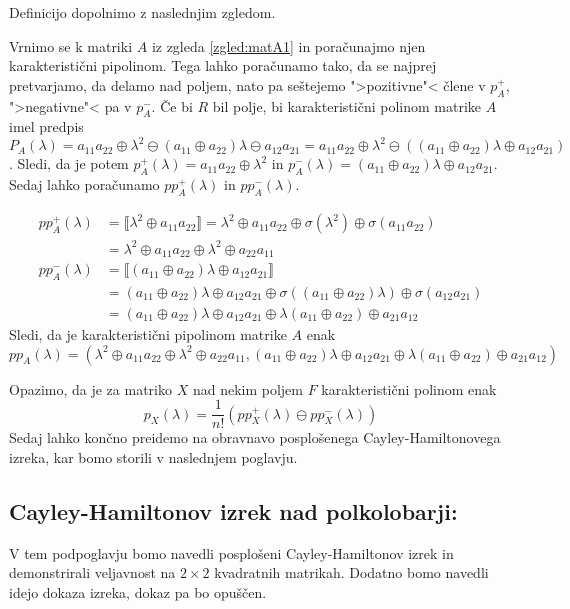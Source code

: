 \documentclass[mat1]{fmfdelo}
\begin{document}
Definicijo dopolnimo z naslednjim zgledom.

\begin{zgled}\label{zgled:matA2}
Vrnimo se k matriki $A$ iz zgleda \ref{zgled:matA1} in poračunajmo njen karakteristični pipolinom. Tega lahko poračunamo tako, da se najprej pretvarjamo, da delamo nad poljem, nato pa seštejemo ">pozitivne"< člene v $p_A^{+}$, ">negativne"< pa v $p_A^{-}$.
Če bi $R$ bil polje, bi karakteristični polinom matrike $A$ imel predpis $P_A(\lambda) = a_{11}a_{22} \oplus \lambda^2 \ominus (a_{11} \oplus a_{22})\lambda \ominus a_{12}a_{21} = a_{11}a_{22} \oplus \lambda^2 \ominus ((a_{11} \oplus a_{22})\lambda \oplus a_{12}a_{21})$. Sledi, da je potem $p_A^{+}(\lambda) = a_{11}a_{22} \oplus \lambda^2$ in $p_A^{-}(\lambda) = (a_{11} \oplus a_{22})\lambda \oplus a_{12}a_{21}$. Sedaj lahko poračunamo $pp_A^{+}(\lambda)$ in $pp_A^{-}(\lambda)$.

\begin{align*}
	pp_A^{+}(\lambda) &= \llbracket \lambda^2 \oplus a_{11}a_{22}\rrbracket = \lambda^2 \oplus a_{11}a_{22} \oplus \sigma(\lambda^2) \oplus \sigma(a_{11}a_{22}) \\ 
	&= \lambda^2 \oplus a_{11}a_{22} \oplus \lambda^2 \oplus a_{22}a_{11} \\
	pp_A^{-}(\lambda) &= \llbracket (a_{11} \oplus a_{22})\lambda \oplus a_{12}a_{21}\rrbracket \\ &= (a_{11} \oplus a_{22})\lambda \oplus a_{12}a_{21} \oplus \sigma((a_{11} \oplus a_{22})\lambda) \oplus \sigma(a_{12}a_{21}) \\ 
	&= (a_{11} \oplus a_{22})\lambda \oplus a_{12}a_{21} \oplus \lambda(a_{11} \oplus a_{22}) \oplus a_{21}a_{12}
\end{align*}
Sledi, da je karakteristični pipolinom matrike $A$ enak $$pp_A(\lambda)= (\lambda^2 \oplus a_{11}a_{22} \oplus \lambda^2 \oplus a_{22}a_{11}, (a_{11} \oplus a_{22})\lambda \oplus a_{12}a_{21} \oplus \lambda(a_{11} \oplus a_{22}) \oplus a_{21}a_{12})$$
\end{zgled}

Opazimo, da je za matriko $X$ nad nekim poljem $F$ karakteristični polinom enak $$p_X(\lambda) = \frac{1}{n!}(pp_X^{+}(\lambda) \ominus pp_X^{-}(\lambda))$$ Sedaj lahko končno preidemo na obravnavo posplošenega Cayley-Hamiltonovega izreka, kar bomo storili v naslednjem poglavju.

\subsection{Cayley-Hamiltonov izrek nad polkolobarji:} \label{subsect:CHTtheorem}
V tem podpoglavju bomo navedli posplošeni Cayley-Hamiltonov izrek in demonstrirali veljavnost na $2\times 2$ kvadratnih matrikah. Dodatno bomo navedli idejo dokaza izreka, dokaz pa bo opuščen. 
\end{document}
